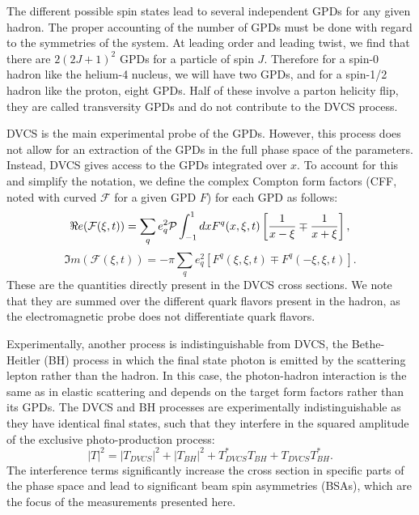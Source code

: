 \documentclass[aps,prc,preprint,superscriptaddress]{revtex4}
\begin{document}
The different possible spin states lead to several independent GPDs for any 
given hadron. The proper accounting of the number of GPDs must be done with 
regard to the symmetries of the system. At leading order and leading twist, we 
find that there are $2(2J+1)^2$ GPDs for a particle of spin $J$. 
Therefore for a spin-0 hadron like the helium-4 nucleus, we will have two GPDs, and 
for a spin-1/2 hadron like the proton, eight GPDs. Half of these involve a 
parton helicity flip, they are called transversity GPDs and do not contribute to 
the DVCS process. 

DVCS is the main experimental probe of the GPDs. However, this process does not allow
for an extraction of the GPDs in the full phase space of the parameters. Instead, 
DVCS gives access to the GPDs integrated over $x$. 
To account for this and simplify the notation, we define the complex Compton form factors (CFF,
noted with curved $\mathcal{F}$ for a given GPD $F$) for each GPD as follows:
\begin{equation}
\Re e (\mathcal{F}(\xi,t)) = \sum _q e^2_q \mathcal{P} \int^1_{-1} dx F^{q}(x,\xi,t)
    \left [ {1 \over x - \xi} \mp {1 \over x + \xi} \right], 
\end{equation}
\begin{equation}
\Im m (\mathcal{F}(\xi,t)) = - \pi \sum _q e^2_q \left [ F^{q}(\xi,\xi,t) \mp F^{q}(-\xi,\xi,t) \right]. 
\end{equation} 
These are the quantities directly present in the DVCS cross sections. We note that they are summed over
the different quark flavors present in the hadron, as the electromagnetic probe does not differentiate
quark flavors.

Experimentally, another process is indistinguishable from DVCS, the Bethe-Heitler (BH) 
process in which 
the final state photon is emitted by the scattering lepton rather than the hadron. In this case, the 
photon-hadron interaction is the same as in elastic scattering and depends on the
target form factors rather than its GPDs. The DVCS and BH processes are experimentally 
indistinguishable as they
have identical final states, such that they interfere in the squared amplitude of the
exclusive photo-production process:
\begin{equation}
|T|^2 = |T_{DVCS}|^2 + |T_{BH}|^2 + T_{DVCS}^* T_{BH} + T_{DVCS}T_{BH}^*. 
\end{equation}
The interference terms significantly increase the cross section in specific parts of the phase space
and lead to significant beam spin asymmetries (BSAs), which are the focus of the measurements presented 
here. 
\end{document}
